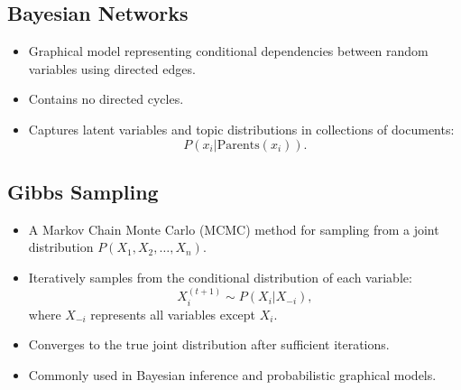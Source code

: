 \documentclass[12pt,a4paper]{article}
\begin{document}
\subsection{Bayesian Networks}
\begin{itemize}
    \item Graphical model representing conditional dependencies between random variables using directed edges.
    \item Contains no directed cycles.
    \item Captures latent variables and topic distributions in collections of documents:
    \[ P(x_i | \text{Parents}(x_i)). \]
\end{itemize}


\subsection{Gibbs Sampling}
\begin{itemize}
    \item A Markov Chain Monte Carlo (MCMC) method for sampling from a joint distribution $P(X_1, X_2, \dots, X_n)$.
    \item Iteratively samples from the conditional distribution of each variable:
    \[ X_i^{(t+1)} \sim P(X_i | X_{-i}), \]
    where $X_{-i}$ represents all variables except $X_i$.
    \item Converges to the true joint distribution after sufficient iterations.
    \item Commonly used in Bayesian inference and probabilistic graphical models.
\end{itemize}
\end{document}
